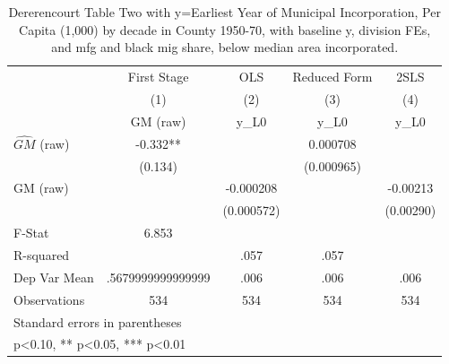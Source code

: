 \begin{table}[htbp]\centering
\def\sym#1{\ifmmode^{#1}\else\(^{#1}\)\fi}
\caption{Dererencourt Table Two with y=Earliest Year of Municipal Incorporation, Per Capita (1,000) by decade in County 1950-70, with baseline y, division FEs, and mfg and black mig share, below median area incorporated.}
\begin{tabular}{l*{4}{c}}
\toprule
                    & First Stage   &         OLS   &Reduced Form   &        2SLS   \\
                    &\multicolumn{1}{c}{(1)}&\multicolumn{1}{c}{(2)}&\multicolumn{1}{c}{(3)}&\multicolumn{1}{c}{(4)}\\
                    &\multicolumn{1}{c}{GM  (raw)}&\multicolumn{1}{c}{y\_L0}&\multicolumn{1}{c}{y\_L0}&\multicolumn{1}{c}{y\_L0}\\
\midrule
$\hat{GM}$ (raw)    &      -0.332** &               &    0.000708   &               \\
                    &     (0.134)   &               &  (0.000965)   &               \\
\addlinespace
GM  (raw)           &               &   -0.000208   &               &    -0.00213   \\
                    &               &  (0.000572)   &               &   (0.00290)   \\
\midrule
F-Stat              &       6.853   &               &               &               \\
R-squared           &               &        .057   &        .057   &               \\
Dep Var Mean        &.5679999999999999   &        .006   &        .006   &        .006   \\
Observations        &         534   &         534   &         534   &         534   \\
\bottomrule
\multicolumn{5}{l}{\footnotesize Standard errors in parentheses}\\
\multicolumn{5}{l}{\footnotesize * p<0.10, ** p<0.05, *** p<0.01}\\
\end{tabular}
\end{table}
